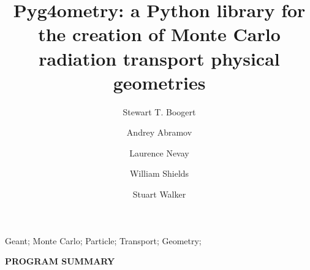 \documentclass[final,5p,times,twocolumn]{elsarticle}
\begin{document}
\begin{frontmatter}



\title{Pyg4ometry: a Python library for the creation of Monte Carlo radiation transport physical geometries}


\author[a]{Stewart T. Boogert}
\author[a]{Andrey Abramov}
\author[a]{Laurence Nevay}
\author[a]{William Shields}
\author[a]{Stuart Walker}

\address[a]{John Adams Institute at Royal Holloway, Department of Physics, Royal Holloway, Egham, TW20 0EX, Surrey, UK}

\begin{abstract}
\end{abstract}

\begin{keyword}
Geant; Monte Carlo; Particle; Transport; Geometry; 

\end{keyword}

\end{frontmatter}



\linenumbers

{\bf PROGRAM SUMMARY}
\end{document}
